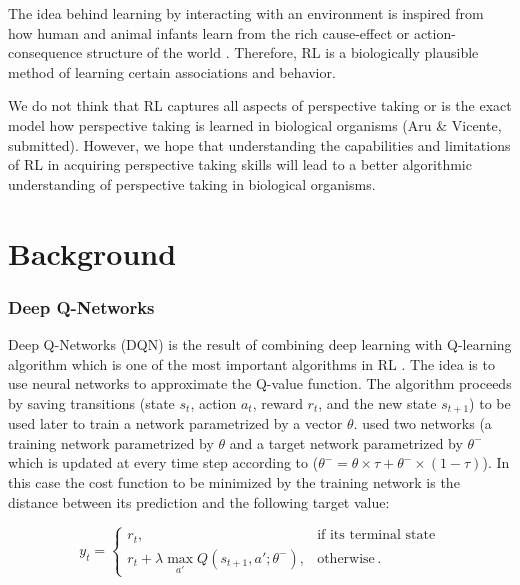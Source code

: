 \documentclass{article}
\begin{document}
\par 
The idea behind learning by interacting with an environment is inspired from how human and animal infants learn from the rich cause-effect or action-consequence structure of the world \cite{sutton1998reinforcement,thorndike1911animal,schultz1997neural}. Therefore, RL is a biologically plausible method of learning certain associations and behavior. 

We do not think that RL captures all aspects of perspective taking or is the exact model how perspective taking is learned in biological organisms (Aru \& Vicente, submitted). However, we hope that understanding the capabilities and limitations of RL in acquiring perspective taking skills will lead to a better algorithmic understanding of perspective taking in biological organisms.
\section{Background}

\subsubsection{Deep Q-Networks} \label{Deep.Q.L}
Deep Q-Networks (DQN) is the result of combining deep learning with Q-learning \cite{watkins1989learning,watkins1992q} algorithm which is one of the most important algorithms in RL \cite{sutton1998reinforcement}. The idea is to use neural networks to approximate the Q-value function. The algorithm proceeds by saving transitions (state \(s_t\), action \(a_t\), reward \(r_t\), and the new state \(s_{t+1}\)) to be used later to train a network parametrized by a vector \(\theta\). \cite{mnih2015human} used two networks (a training network parametrized by \(\theta\) and a target network parametrized by \(\theta^{-}\) which is updated at every time step according to (\(\theta^{-} = \theta \times \tau + \theta^{-} \times (1-\tau)\)). In this case the cost function to be minimized by the training network is the distance between its prediction and the following target value:

\begin{equation} \label{eq:0.06}
    y_t=
    \begin{cases}
      r_t, & \text{if its terminal state} \\
      r_t+ \lambda \underset{a'}{\max}Q(s_{t+1},a';\theta^{-}) , & \text{otherwise}  \, .
    \end{cases}
\end{equation}
\end{document}

